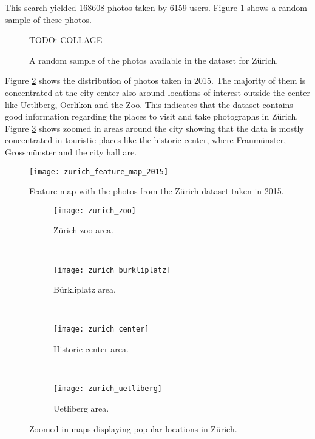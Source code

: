 This search yielded 168608 photos taken by 6159 users. Figure \ref{fig:random_photos} shows a random sample of these photos.

\begin{figure}
  \centering
  TODO: COLLAGE
  \caption{A random sample of the photos available in the dataset for Zürich.}
  \label{fig:random_photos}
\end{figure}

Figure \ref{fig:heatmap_zurich} shows the distribution of photos taken in 2015. The majority of them is concentrated at the city center also around locations of interest outside the center like Uetliberg, Oerlikon and the Zoo. This indicates that the dataset contains good information regarding the places to visit and take photographs in Zürich. Figure \ref{fig:heatmap_zurich_zoom} shows zoomed in areas around the city showing that the data is mostly concentrated in touristic places like the historic center, where Fraumünster, Grossmünster and the city hall are.

\begin{figure}
  \centering
  \texttt{[image: zurich\_feature\_map\_2015]}
  \caption{Feature map with the photos from the Zürich dataset taken in 2015.}
  \label{fig:heatmap_zurich}
\end{figure}

\begin{figure}
  \centering
  \begin{subfigure}[b]{0.45\textwidth}
    \texttt{[image: zurich\_zoo]}
    \caption{Zürich zoo area.}
  \end{subfigure}
  ~
  \begin{subfigure}[b]{0.45\textwidth}
    \texttt{[image: zurich\_burkliplatz]}
    \caption{Bürkliplatz area.}
  \end{subfigure}
  \hfill \\
  \begin{subfigure}[b]{0.45\textwidth}
    \texttt{[image: zurich\_center]}
    \caption{Historic center area.}
  \end{subfigure}
  ~
  \begin{subfigure}[b]{0.45\textwidth}
    \texttt{[image: zurich\_uetliberg]}
    \caption{Uetliberg area.}
  \end{subfigure}
  \caption{Zoomed in maps displaying popular locations in Zürich.}
  \label{fig:heatmap_zurich_zoom}
\end{figure}

